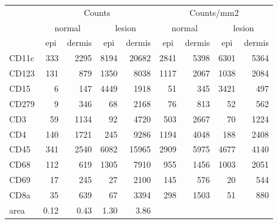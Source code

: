 \begin{tabular}{lrrrr|rrrr}
   \hline
 
         \multicolumn{1}{c}{} & \multicolumn{4}{c|}{Counts} & \multicolumn{4}{c}{Counts/mm2} \\ 
         \multicolumn{1}{c}{} & \multicolumn{2}{c}{normal} & \multicolumn{2}{c|}{lesion} & \multicolumn{2}{c}{normal} & \multicolumn{2}{c}{lesion}  \\ 
         \multicolumn{1}{c}{} & \multicolumn{1}{c}{epi} & dermis & \multicolumn{1}{c}{epi} & \multicolumn{1}{c|}{dermis} & \multicolumn{1}{c}{epi} & dermis & \multicolumn{1}{c}{epi} & dermis  \\ 
         \hline
    CD11c & 333 & 2295 & 8194 & 20682 & 2841 & 5398 & 6301 & 5364 \\ 
  CD123 & 131 & 879 & 1350 & 8038 & 1117 & 2067 & 1038 & 2084 \\ 
  CD15 & 6 & 147 & 4449 & 1918 & 51 & 345 & 3421 & 497 \\ 
  CD279 & 9 & 346 & 68 & 2168 & 76 & 813 & 52 & 562 \\ 
  CD3 & 59 & 1134 & 92 & 4720 & 503 & 2667 & 70 & 1224 \\ 
  CD4 & 140 & 1721 & 245 & 9286 & 1194 & 4048 & 188 & 2408 \\ 
  CD45 & 341 & 2540 & 6082 & 15965 & 2909 & 5975 & 4677 & 4140 \\ 
  CD68 & 112 & 619 & 1305 & 7910 & 955 & 1456 & 1003 & 2051 \\ 
  CD69 & 17 & 245 & 27 & 2100 & 145 & 576 & 20 & 544 \\ 
  CD8a & 35 & 639 & 67 & 3394 & 298 & 1503 & 51 & 880 \\ 
  area & 0.12 & 0.43 & 1.30 & 3.86 &    &    &    &    \\ 
   \hline
\end{tabular}
